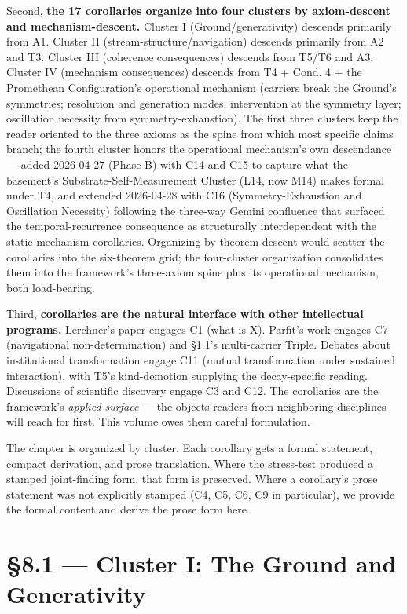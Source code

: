 \documentclass[11pt, openany]{book}
\newcommand{\sectionbreak}{\clearpage}
\begin{document}
Second, \textbf{the 17 corollaries organize into four clusters by axiom-descent and mechanism-descent.} Cluster I (Ground/generativity) descends primarily from A1. Cluster II (stream-structure/navigation) descends primarily from A2 and T3. Cluster III (coherence consequences) descends from T5/T6 and A3. Cluster IV (mechanism consequences) descends from T4 + Cond. 4 + the Promethean Configuration's operational mechanism (carriers break the Ground's symmetries; resolution and generation modes; intervention at the symmetry layer; oscillation necessity from symmetry-exhaustion). The first three clusters keep the reader oriented to the three axioms as the spine from which most specific claims branch; the fourth cluster honors the operational mechanism's own descendance --- added 2026-04-27 (Phase B) with C14 and C15 to capture what the basement's Substrate-Self-Measurement Cluster (L14, now M14) makes formal under T4, and extended 2026-04-28 with C16 (Symmetry-Exhaustion and Oscillation Necessity) following the three-way Gemini confluence that surfaced the temporal-recurrence consequence as structurally interdependent with the static mechanism corollaries. Organizing by theorem-descent would scatter the corollaries into the six-theorem grid; the four-cluster organization consolidates them into the framework's three-axiom spine plus its operational mechanism, both load-bearing.

Third, \textbf{corollaries are the natural interface with other intellectual programs.} Lerchner's paper engages C1 (what is X). Parfit's work engages C7 (navigational non-determination) and §1.1's multi-carrier Triple. Debates about institutional transformation engage C11 (mutual transformation under sustained interaction), with T5's kind-demotion supplying the decay-specific reading. Discussions of scientific discovery engage C3 and C12. The corollaries are the framework's \textit{applied surface} --- the objects readers from neighboring disciplines will reach for first. This volume owes them careful formulation.

The chapter is organized by cluster. Each corollary gets a formal statement, compact derivation, and prose translation. Where the stress-test produced a stamped joint-finding form, that form is preserved. Where a corollary's prose statement was not explicitly stamped (C4, C5, C6, C9 in particular), we provide the formal content and derive the prose form here.

\sectionbreak

\section{§8.1 --- Cluster I: The Ground and Generativity}
\end{document}
